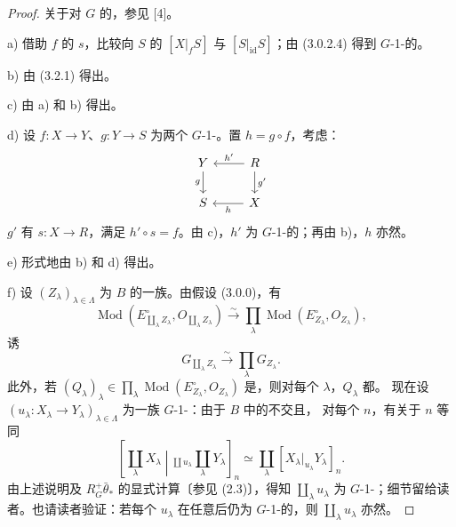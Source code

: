 \begin{proof}
关于对 $G$ 的，参见 [4]。

 a) 借助 $f$ 的 $s$，比较向 $S$ 的 $[X|_fS]$ 与 $[S|_{\mathrm{id}}S]$；由 (3.0.2.4) 得到 $G$-1-的。

 b) 由 (3.2.1) 得出。

 c) 由 a) 和 b) 得出。

 d) 设 $f:X\to Y$、$g:Y\to S$ 为两个 $G$-1-。置 $h=g\circ f$，考虑：
\[
\begin{tikzcd}
Y\arrow[d,"g"']&R\arrow[l,"h'"']\arrow[d,"g'"]\\
S&X\arrow[l,"h"]
\end{tikzcd}
\]
$g'$ 有 $s:X\to R$，满足 $h'\circ s=f$。由 c)，$h'$ 为 $G$-1-的；再由 b)，$h$ 亦然。

 e) 形式地由 b) 和 d) 得出。

 f) 设 $(Z_\lambda)_{\lambda\in\Lambda}$ 为 $B$ 的一族。由假设 (3.0.0)，有
\[
\operatorname{Mod}(E_{\coprod_\lambda Z_\lambda}^{\circ},O_{\coprod_\lambda Z_\lambda})
\xrightarrow{\sim}\prod_\lambda\operatorname{Mod}(E_{Z_\lambda}^{\circ},O_{Z_\lambda}),
\]
诱
\[
G_{\coprod_\lambda Z_\lambda}\xrightarrow{\sim}\prod_\lambda G_{Z_\lambda}.
\]
此外，若 $(Q_\lambda)_\lambda\in\prod_\lambda\operatorname{Mod}(E_{Z_\lambda}^{\circ},O_{Z_\lambda})$ 是，则对每个 $\lambda$，$Q_\lambda$ 都。
现在设 $(u_\lambda:X_\lambda\to Y_\lambda)_{\lambda\in\Lambda}$ 为一族 $G$-1-：由于 $B$ 中的不交且，
对每个 $n$，有关于 $n$ 等同
\[
\left[\coprod_\lambda X_\lambda\middle|_{\coprod u_\lambda}\coprod_\lambda Y_\lambda\right]_n
\simeq\coprod_\lambda[X_\lambda|_{u_\lambda}Y_\lambda]_n.
\]
由上述说明及 $R_G^+\bar\theta_*$ 的显式计算〔参见 (2.3)〕，得知 $\coprod_\lambda u_\lambda$ 为 $G$-1-；细节留给读者。也请读者验证：若每个 $u_\lambda$ 在任意后仍为 $G$-1-的，则 $\coprod_\lambda u_\lambda$ 亦然。
\end{proof}
